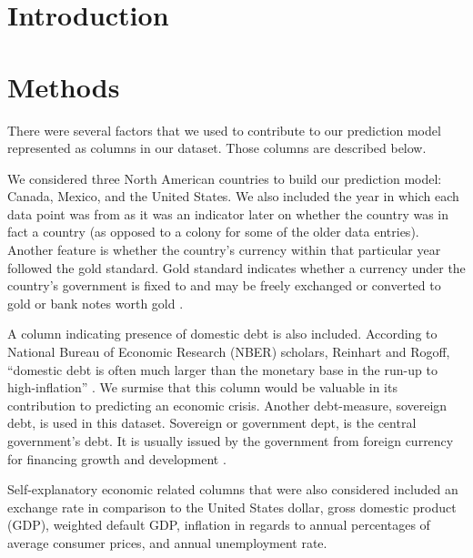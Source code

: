 \documentclass[12pt]{article}
\begin{document}
\maketitle

\begin{abstract}

\end{abstract}


\section{Introduction}

\section{Methods}
There were several factors that we used to contribute to our prediction model represented as columns in our dataset. Those columns are described below.

We considered three North American countries to build our prediction model: Canada, Mexico, and the United States. We also included the year in which each data point was from as it was an indicator later on whether the country was in fact a country (as opposed to a colony for some of the older data entries). 
Another feature is whether the country’s currency within that particular year followed the gold standard. Gold standard indicates whether a currency under the country’s government is fixed to and may be freely exchanged or converted to gold or bank notes worth gold \cite{chengold}.

A column indicating presence of domestic debt is also included. According to National Bureau of Economic Research (NBER) scholars, Reinhart and Rogoff, “domestic debt is often much larger than the monetary base in the run-up to high-inflation” \cite{nber}. We surmise that this column would be valuable in its contribution to predicting an economic crisis. Another debt-measure, sovereign debt, is used in this dataset. Sovereign or government dept, is the central government's debt. It is usually issued by the government from foreign currency for financing growth and development \cite{chensovereign}.

Self-explanatory economic related columns that were also considered included an exchange rate in comparison to the United States dollar, gross domestic product (GDP), weighted default GDP, inflation in regards to annual percentages of average consumer prices, and annual unemployment rate. 
\end{document}
